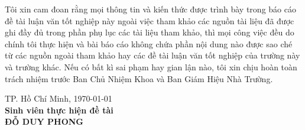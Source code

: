 \setlength\parindent{0pt}
\hspace{0.5cm}Tôi xin cam đoan rằng mọi thông tin và kiến thức được trình bày trong báo cáo đề tài luận văn tốt nghiệp này ngoài việc tham khảo các nguồn tài liệu đã được ghi đầy đủ trong phần phụ lục các tài liệu tham khảo, thì mọi công việc đều do chính tôi thực hiện và bài báo cáo không chứa phần nội dung nào được sao ché từ các nguồn ngoài tham khảo hay các đề tài luận văn tốt nghiệp của trường này và trường khác. Nếu có bất kì sai phạm hay gian lận nào, tôi xin chịu hoàn toàn trách nhiệm trước Ban Chủ Nhiệm Khoa và Ban Giám Hiệu Nhà Trường.\\

\hspace{5cm}
\begin{minipage}[t]{0.60\linewidth}
	\begin{center}
		TP. Hồ Chí Minh, \today\\
		\textbf{Sinh viên thực hiện đề tài}\\[3cm]
		\textbf{ĐỖ DUY PHONG}
	\end{center}
\end{minipage}